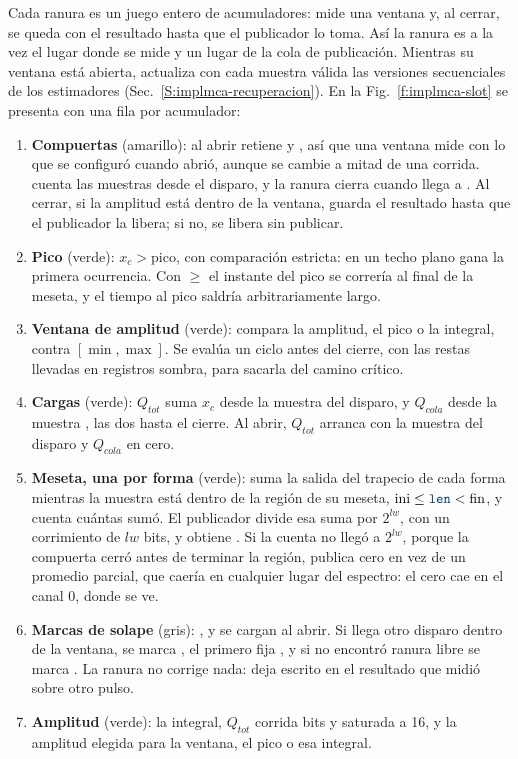 Cada ranura es un juego entero de acumuladores: mide una ventana y, al cerrar,
se queda con el resultado hasta que el publicador lo toma. Así la ranura es a la
vez el lugar donde se mide y un lugar de la cola de publicación. Mientras su
ventana está abierta, actualiza con cada muestra válida las versiones
secuenciales de los estimadores (Sec.~\ref{S:implmca-recuperacion}). En la
Fig.~\ref{f:implmca-slot} se presenta con una fila por acumulador:
\begin{enumerate}
  \item \textbf{Compuertas} (amarillo): al abrir retiene  y
    , así que una ventana mide con lo que se configuró cuando
    abrió, aunque se cambie a mitad de una corrida.  cuenta las
    muestras desde el disparo, y la ranura cierra cuando llega a
    . Al cerrar, si la amplitud está dentro de la ventana,
    guarda el resultado hasta que el publicador la libera; si no, se libera sin
    publicar.
  \item \textbf{Pico} (verde): $x_c > \text{pico}$, con comparación estricta: en
    un techo plano gana la primera ocurrencia. Con $\ge$ el instante del pico se
    correría al final de la meseta, y el tiempo al pico saldría arbitrariamente
    largo.
  \item \textbf{Ventana de amplitud} (verde): compara la amplitud, el pico o la
    integral, contra $[\min, \max]$. Se evalúa un ciclo antes del cierre, con
    las restas llevadas en registros sombra, para sacarla del camino crítico.
  \item \textbf{Cargas} (verde): $Q_{tot}$ suma $x_c$ desde la muestra del
    disparo, y $Q_{cola}$ desde la muestra , las dos hasta
    el cierre. Al abrir, $Q_{tot}$ arranca con la muestra del disparo y
    $Q_{cola}$ en cero.
  \item \textbf{Meseta, una por forma} (verde): suma la salida del trapecio de
    cada forma mientras la muestra está dentro de la región de su meseta,
    $\text{ini} \le \text{\codigo{len}} < \text{fin}$, y cuenta cuántas sumó. El
    publicador divide esa suma por $2^{lw}$, con un corrimiento de $lw$ bits, y
    obtiene . Si la cuenta no llegó a $2^{lw}$, porque la
    compuerta cerró antes de terminar la región, publica cero en vez de un
    promedio parcial, que caería en cualquier lugar del espectro: el cero cae en
    el canal 0, donde se ve.
  \item \textbf{Marcas de solape} (gris): ,  y
     se cargan al abrir. Si llega otro disparo dentro de la
    ventana, se marca , el primero fija , y si
    no encontró ranura libre se marca . La ranura no corrige
    nada: deja escrito en el resultado que midió sobre otro pulso.
  \item \textbf{Amplitud} (verde): la integral, $Q_{tot}$ corrida
     bits y saturada a 16, y la amplitud elegida para la
    ventana, el pico o esa integral.
\end{enumerate}

